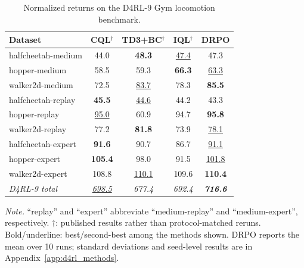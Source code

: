 \documentclass{article}
\theoremstyle{plain}
\theoremstyle{definition}
\theoremstyle{remark}
\begin{document}
\begin{table}[t]
\centering
\caption{Normalized returns on the D4RL-9 Gym locomotion benchmark.}
\label{tab:d4rl_performance}

\small
\setlength{\tabcolsep}{3.9pt}
\renewcommand{\arraystretch}{1.07}

\begin{tabular*}{\columnwidth}{@{\extracolsep{\fill}}lcccc}
\toprule
Dataset
&
CQL$^\dagger$
&
TD3+BC$^\dagger$
&
IQL$^\dagger$
&
\textbf{DRPO}
\\
\midrule

halfcheetah-medium
& 44.0 & \textbf{48.3} & \underline{47.4} & 47.3 \\
hopper-medium
& 58.5 & 59.3 & \textbf{66.3} & \underline{63.3} \\
walker2d-medium
& 72.5 & \underline{83.7} & 78.3 & \textbf{85.5} \\

\midrule

halfcheetah-replay
& \textbf{45.5} & \underline{44.6} & 44.2 & 43.3 \\
hopper-replay
& \underline{95.0} & 60.9 & 94.7 & \textbf{95.8} \\
walker2d-replay
& 77.2 & \textbf{81.8} & 73.9 & \underline{78.1} \\

\midrule

halfcheetah-expert
& \textbf{91.6} & 90.7 & 86.7 & \underline{91.1} \\
hopper-expert
& \textbf{105.4} & 98.0 & 91.5 & \underline{101.8} \\
walker2d-expert
& 108.8 & \underline{110.1} & 109.6 & \textbf{110.4} \\

\midrule

\textit{D4RL-9 total}
& \textit{\underline{698.5}}
& \textit{677.4}
& \textit{692.4}
& \textbf{\textit{716.6}}
\\

\bottomrule
\end{tabular*}

\vspace{2pt}

\begin{minipage}{\columnwidth}
\small
\textit{Note.} ``replay'' and ``expert'' abbreviate ``medium-replay'' and
``medium-expert'', respectively. $\dagger$: published results rather than
protocol-matched reruns. Bold/underline: best/second-best among the methods
shown. DRPO reports the mean over 10 runs; standard deviations and seed-level
results are in Appendix~\ref{app:d4rl_methods}.
\end{minipage}

\end{table}
\end{document}
